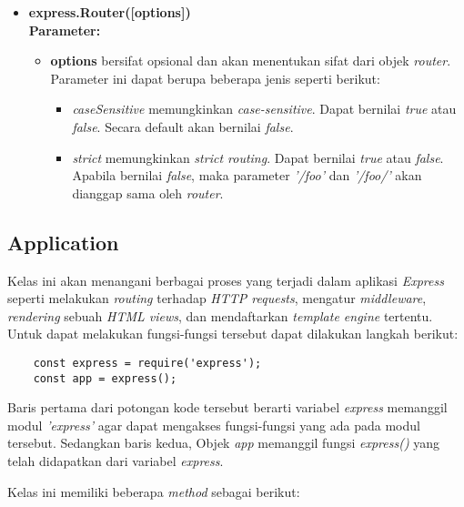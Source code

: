 \begin{itemize}
	\item \textbf{express.Router([options])} \\ \textbf{Parameter:} 
	\begin{itemize}
		\item \textbf{options} bersifat opsional dan akan menentukan sifat dari objek \textit{router}. Parameter ini dapat berupa beberapa jenis seperti berikut:
		\begin{itemize}
			\item \textit{caseSensitive} memungkinkan \textit{case-sensitive}. Dapat bernilai \textit{true} atau \textit{false}. Secara default akan bernilai \textit{false}.
			
			\item \textit{strict} memungkinkan \textit{strict routing}. Dapat bernilai \textit{true} atau \textit{false}. Apabila bernilai \textit{false}, maka parameter \textit{'/foo'} dan \textit{'/foo/'} akan dianggap sama oleh \textit{router}.
		\end{itemize}
	\end{itemize}
	
\end{itemize}

\subsection{Application}
Kelas ini akan menangani berbagai proses yang terjadi dalam aplikasi \textit{Express} seperti melakukan \textit{routing} terhadap \textit{HTTP requests}, mengatur \textit{middleware}, \textit{rendering} sebuah \textit{HTML views}, dan mendaftarkan \textit{template engine} tertentu. Untuk dapat melakukan fungsi-fungsi tersebut dapat dilakukan langkah berikut:

\begin{lstlisting}
	const express = require('express');
	const app = express();
\end{lstlisting}

Baris pertama dari potongan kode tersebut berarti variabel \textit{express} memanggil modul \textit{'express'} agar dapat mengakses fungsi-fungsi yang ada pada modul tersebut. Sedangkan baris kedua, Objek \textit{app} memanggil fungsi \textit{express()} yang telah didapatkan dari variabel \textit{express}.

Kelas ini memiliki beberapa \textit{method} sebagai berikut:

